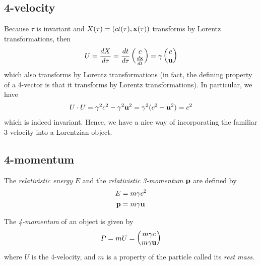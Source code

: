 \documentclass{../template/note}
\begin{document}
    \subsection{4-velocity}

    Because \(\tau\) is invariant and \(X(\tau) = (ct(\tau), \V x(\tau))\) transforms by Lorentz transformations, then
    \begin{align*}
        U = \frac{dX}{d\tau} = \frac{dt}{d\tau} \begin{pmatrix}
         c \\
         \frac{d\V x}{dt} \\
        \end{pmatrix} = \gamma \begin{pmatrix}
         c \\
         \V u \\
        \end{pmatrix}
    \end{align*}
    which also transforms by Lorentz transformations (in fact, the defining property of a 4-vector is that it transforms by Lorentz transformations). In particular, we have
    \begin{align*}
        U \cdot U = \gamma^2c^2 - \gamma^2 \V u^2 = \gamma^2(c^2-\V u^2) = c^2
    \end{align*}
    which is indeed invariant. Hence, we have a nice way of incorporating the familiar 3-velocity into a Lorentzian object.
    
    

    \subsection{4-momentum}
    
    \begin{definition}
        The \emph{relativistic energy} \(E\) and the \emph{relativistic 3-momentum} \(\V p\) are defined by
        \begin{align*}
            E &= m\gamma c^2 \\
            \V p &= m\gamma \V u
        \end{align*}
    \end{definition}

    \begin{definition}[4-momentum]
        The \emph{4-momentum} of an object is given by
        \begin{align*}
            P = mU = \begin{pmatrix}
                m\gamma c \\
                m\gamma \V u \\
            \end{pmatrix}
        \end{align*}
        where \(U\) is the 4-velocity, and \(m\) is a property of the particle called its \emph{rest mass}.      
    \end{definition}
    
\end{document}
